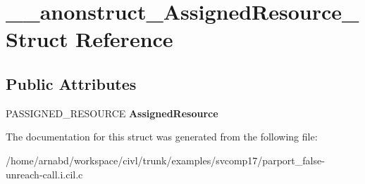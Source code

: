 \hypertarget{struct____anonstruct__AssignedResource__32}{}\section{\+\_\+\+\_\+anonstruct\+\_\+\+Assigned\+Resource\+\_ Struct Reference}
\label{struct____anonstruct__AssignedResource__32}
\subsection*{Public Attributes}
\begin{DoxyCompactItemize}
\item 
\hypertarget{struct____anonstruct__AssignedResource__32_ac35be6244ad89ed01e67eeec237bd473}{}P\+A\+S\+S\+I\+G\+N\+E\+D\+\_\+\+R\+E\+S\+O\+U\+R\+C\+E {\bfseries Assigned\+Resource}\label{struct____anonstruct__AssignedResource__32_ac35be6244ad89ed01e67eeec237bd473}

\end{DoxyCompactItemize}


The documentation for this struct was generated from the following file\+:\begin{DoxyCompactItemize}
\item 
/home/arnabd/workspace/civl/trunk/examples/svcomp17/parport\+\_\+false-\/unreach-\/call.\+i.\+cil.\+c\end{DoxyCompactItemize}
